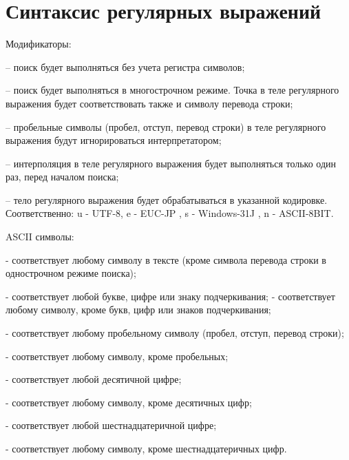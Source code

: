 \hypertarget{appregexp}{}
\chapter{Синтаксис регулярных выражений}

\begin{keylist}{Модификаторы:}
  
   – поиск будет выполняться без учета регистра символов;
  
   – поиск будет выполняться в многострочном режиме. Точка в теле регулярного выражения будет соответствовать также и символу перевода строки;
  
   – пробельные символы (пробел, отступ, перевод строки) в теле регулярного выражения будут игнорироваться интерпретатором;
  
   – интерполяция в теле регулярного выражения будет выполняться только один раз, перед началом поиска;
  
   – тело регулярного выражения будет обрабатываться в указанной кодировке. Соответственно: u - UTF-8, e - EUC-JP , s - Windows-31J , n - ASCII-8BIT.
\end{keylist}

\begin{keylist}{ASCII символы:}
  
   - соответствует любому символу в тексте (кроме символа перевода строки в однострочном режиме поиска);
  
   - соответствует любой букве, цифре или знаку подчеркивания;  
   - соответствует любому символу, кроме букв, цифр или знаков подчеркивания;
  
   - соответствует любому пробельному символу (пробел, отступ, перевод строки);
  
   - соответствует любому символу, кроме пробельных;
  
   - соответствует любой десятичной цифре;
  
   - соответствует любому символу, кроме десятичных цифр;
  
   - соответствует любой шестнадцатеричной цифре;
  
   - соответствует любому символу, кроме шестнадцатеричных цифр.
\end{keylist}

